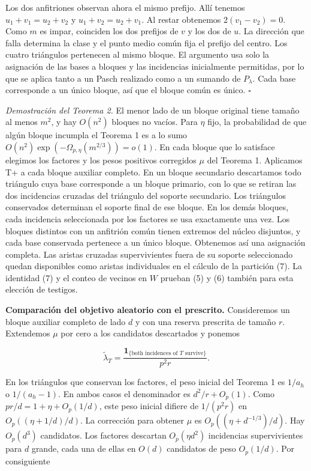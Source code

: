 \documentclass[spanish,11pt,a4paper]{article}
\begin{document}
Los dos anfitriones observan ahora el mismo prefijo. Allí tenemos \(u_1+v_1=u_2+v_2\) y \(u_1+v_2=u_2+v_1\). Al restar obtenemos \(2(v_1-v_2)=0\). Como \(m\) es impar, coinciden los dos prefijos de \(v\) y los dos de \(u\). La dirección que falla determina la clase y el punto medio común fija el prefijo del centro. Los cuatro triángulos pertenecen al mismo bloque. El argumento usa solo la asignación de las bases a bloques y las incidencias inicialmente permitidas, por lo que se aplica tanto a un Pasch realizado como a un sumando de \(P_\lambda\). Cada base corresponde a un único bloque, así que el bloque común es único. \(\square\)

\emph{Demostración del Teorema 2.} El menor lado de un bloque original tiene tamaño al menos \(m^2\), y hay \(O(n^2)\) bloques no vacíos. Para \(\eta\) fijo, la probabilidad de que algún bloque incumpla el Teorema 1 es a lo sumo \(O(n^2)\exp(-\Omega_{p,\eta}(m^{2/3}))=o(1)\). En cada bloque que lo satisface elegimos los factores y los pesos positivos corregidos \(\mu\) del Teorema 1. Aplicamos T+ a cada bloque auxiliar completo. En un bloque secundario descartamos todo triángulo cuya base corresponde a un bloque primario, con lo que se retiran las dos incidencias cruzadas del triángulo del soporte secundario. Los triángulos conservados determinan el soporte final de ese bloque. En los demás bloques, cada incidencia seleccionada por los factores se usa exactamente una vez. Los bloques distintos con un anfitrión común tienen extremos del núcleo disjuntos, y cada base conservada pertenece a un único bloque. Obtenemos así una asignación completa. Las aristas cruzadas supervivientes fuera de su soporte seleccionado quedan disponibles como aristas individuales en el cálculo de la partición (7). La identidad (7) y el conteo de vecinos en \(W\) prueban (5) y (6) también para esta elección de testigos.

\textbf{Comparación del objetivo aleatorio con el prescrito.} Consideremos un bloque auxiliar completo de lado \(d\) y con una reserva prescrita de tamaño \(r\). Extendemos \(\mu\) por cero a los candidatos descartados y ponemos

\[\widetilde\lambda_T=\frac{\mathbf1_{\{\text{both incidences of }T\text{ survive}\}}}{p^2r}.\]

En los triángulos que conservan los factores, el peso inicial del Teorema 1 es \(1/a_h\) o \(1/(a_h-1)\). En ambos casos el denominador es \(d^2/r+O_p(1)\). Como \(pr/d=1+\eta+O_p(1/d)\), este peso inicial difiere de \(1/(p^2r)\) en \(O_p((\eta+1/d)/d)\). La corrección para obtener \(\mu\) es \(O_p((\eta+d^{-1/3})/d)\). Hay \(O_p(d^3)\) candidatos. Los factores descartan \(O_p(\eta d^2)\) incidencias supervivientes para \(d\) grande, cada una de ellas en \(O(d)\) candidatos de peso \(O_p(1/d)\). Por consiguiente
\end{document}
